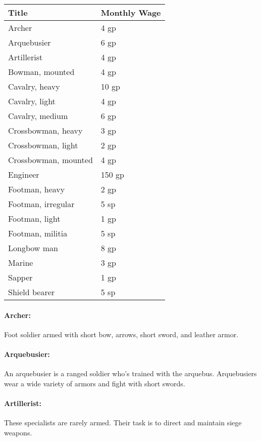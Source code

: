\begin{multicols}{2}
\begin{minipage}{\columnwidth}
\label{militaryoccupations}
\noindent
\begin{tabular}{|p{}|p{}|}
\hline
Title	& Monthly Wage \\
\hline\hline
\rowcolor[gray]{.9}Archer	& 4 gp \\
Arquebusier	& 6 gp \\
\rowcolor[gray]{.9}Artillerist	& 4 gp \\
Bowman, mounted	& 4 gp \\
\rowcolor[gray]{.9}Cavalry, heavy	& 10 gp \\
Cavalry, light	& 4 gp \\
\rowcolor[gray]{.9}Cavalry, medium	& 6 gp \\
Crossbowman, heavy	& 3 gp \\
\rowcolor[gray]{.9}Crossbowman, light	& 2 gp \\
Crossbowman, mounted	& 4 gp \\
\rowcolor[gray]{.9}Engineer	& 150 gp \\
Footman, heavy	& 2 gp \\
\rowcolor[gray]{.9}Footman, irregular	& 5 sp \\
Footman, light	& 1 gp \\
\rowcolor[gray]{.9}Footman, militia	& 5 sp \\
Longbow man	& 8 gp \\
\rowcolor[gray]{.9}Marine	& 3 gp \\
Sapper	& 1 gp \\
\rowcolor[gray]{.9}Shield bearer	& 5 sp \\
\hline
\end{tabular}

\end{minipage}

\paragraph{Archer:} Foot soldier armed with short bow, arrows, short sword, and leather armor.

\paragraph{Arquebusier:}  An arquebusier is a ranged soldier who's trained with the arquebus.  Arquebusiers wear a wide variety of armors and fight with short swords.

\paragraph{Artillerist:} These specialists are rarely armed.  Their task is to direct and maintain siege weapons.


\end{multicols}
